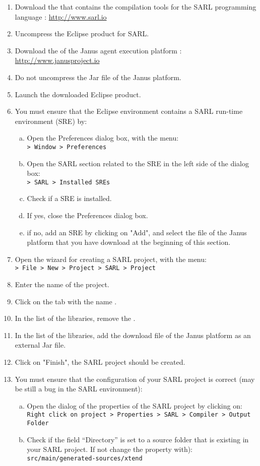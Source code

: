 \begin{enumerate}
\item Download the  that contains the compilation tools for the SARL programming language : \url{http://www.sarl.io}
\item Uncompress the Eclipse product for SARL.
\item Download the  of the Janus agent execution platform : \url{http://www.janusproject.io}
\item Do not uncompress the Jar file of the Janus platform.
\item Launch the downloaded Eclipse product.
\ifJANUSINCLASSPATH\else
\item You must ensure that the Eclipse environment contains a SARL run-time environment (SRE) by: \\
	\parbox{\linewidth}{\begin{enumerate}[a)]
	\item Open the Preferences dialog box, with the menu: \\
		\texttt{> Window > Preferences}
	\item Open the SARL section related to the SRE in the left side of the dialog box: \\
		\texttt{> SARL > Installed SREs}
	\item Check if a SRE is installed.
	\item If yes, close the Preferences dialog box.
	\item if no, add an SRE by clicking on "Add", and select the file of the Janus platform that you have download at the beginning of this section.
	\end{enumerate}}
\fi
\item Open the wizard for creating a SARL project, with the menu: \\
	\texttt{> File > New > Project > SARL > Project}
\item Enter the name of the project.
\ifJANUSINCLASSPATH
\item Click on the tab with the name .
\item In the list of the libraries, remove the .
\item In the list of the libraries, add the download file of the Janus platform as an external Jar file.
\fi
\item Click on "Finish", the SARL project should be created.
\item You must ensure that the configuration of your SARL project is correct (may be still a bug in the SARL environment):
	\begin{enumerate}[a)]
	\item Open the dialog of the properties of the SARL project by clicking on: \\
		\texttt{Right click on project > Properties > SARL > Compiler > Output Folder}
	\item Check if the field ``Directory'' is set to a source folder that is existing in your SARL project. If not change the property with): \\
		\texttt{src/main/generated-sources/xtend}
	\end{enumerate}
\end{enumerate}

